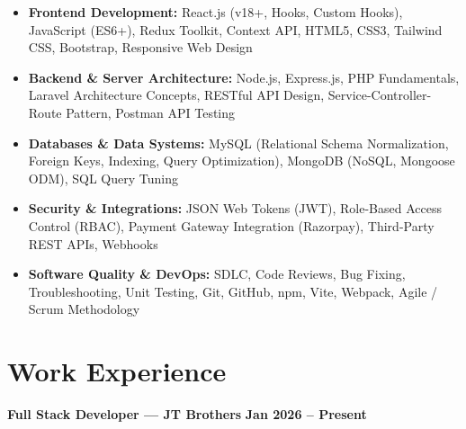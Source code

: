 \documentclass[a4paper,10pt]{article}
\begin{document}
\begin{itemize}

    \item \textbf{Frontend Development:}
    React.js (v18+, Hooks, Custom Hooks), JavaScript (ES6+), Redux Toolkit,
    Context API, HTML5, CSS3, Tailwind CSS, Bootstrap, Responsive Web Design

    \item \textbf{Backend \& Server Architecture:}
    Node.js, Express.js, PHP Fundamentals, Laravel Architecture Concepts,
    RESTful API Design, Service-Controller-Route Pattern, Postman API Testing

    \item \textbf{Databases \& Data Systems:}
    MySQL (Relational Schema Normalization, Foreign Keys, Indexing, Query Optimization),
    MongoDB (NoSQL, Mongoose ODM), SQL Query Tuning

    \item \textbf{Security \& Integrations:}
    JSON Web Tokens (JWT), Role-Based Access Control (RBAC),
    Payment Gateway Integration (Razorpay), Third-Party REST APIs, Webhooks

    \item \textbf{Software Quality \& DevOps:}
    SDLC, Code Reviews, Bug Fixing, Troubleshooting, Unit Testing,
    Git, GitHub, npm, Vite, Webpack, Agile / Scrum Methodology

\end{itemize}

\section*{Work Experience}

\textbf{Full Stack Developer --- JT Brothers}
\hfill
\textbf{Jan 2026 -- Present}
\end{document}
